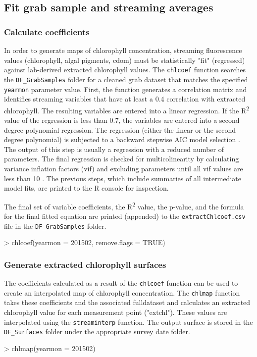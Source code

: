 \documentclass[12pt]{article}
\begin{document}
\subsection{Fit grab sample and streaming averages}
\subsubsection{Calculate coefficients}

In order to generate maps of chlorophyll concentration, streaming fluorescence values (chlorophyll, algal pigments, cdom) must be statistically "fit" (regressed) against lab-derived extracted chlorophyll values. The \texttt{chlcoef} function searches the \verb|DF_GrabSamples| folder for a cleaned grab dataset that matches the specified \texttt{yearmon} parameter value. First, the function generates a correlation matrix and identifies streaming variables that have at least a 0.4 correlation with extracted chlorophyll. The resulting variables are entered into a linear regression. If the R\textsuperscript{2} value of the regression is less than 0.7, the variables are entered into a second degree polynomial regression. The regression (either the linear or the second degree polynomial) is subjected to a backward stepwise AIC model selection \citep{mass}. The output of this step is usually a regression with a reduced number of parameters. The final regression is checked for multicolinearity by calculating variance inflation factors (vif) and excluding parameters until all vif values are less than 10 \citep{hh2002}. The previous steps, which include summaries of all intermediate model fits, are printed to the R console for inspection. 

The final set of variable coefficients, the R\textsuperscript{2} value, the p-value, and the formula for the final fitted equation are printed (appended) to the \texttt{extractChlcoef.csv} file in the \verb|DF_GrabSamples| folder.

\begin{Schunk}
\begin{Sinput}
> chlcoef(yearmon = 201502, remove.flags = TRUE)
\end{Sinput}
\end{Schunk}

\subsubsection{Generate extracted chlorophyll surfaces}

The coefficients calculated as a result of the \texttt{chlcoef} function can be used to create an interpolated map of chlorophyll concentration. The \texttt{chlmap} function takes these coefficients and the associated fulldataset and calculates an extracted chlorophyll value for each measurement point ("extchl"). These values are interpolated using the \texttt{streaminterp} function. The output surface is stored in the \verb|DF_Surfaces| folder under the appropriate survey date folder.  

\begin{Schunk}
\begin{Sinput}
> chlmap(yearmon = 201502)
\end{Sinput}
\end{Schunk}


\medskip

 
\end{document}
